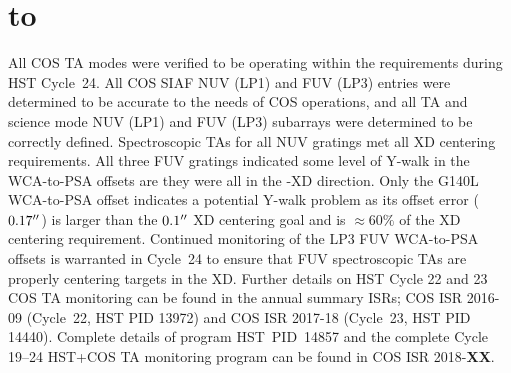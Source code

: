 \documentclass[12pt]{reportj}
\def\arcsec{\hbox{$^{\prime\prime}$}}
\def\ssection#1{\addtocounter{section}{1} \setcounter{subsection}{0} \section*{\hbox to \hsize{\large\bf \arabic{section}. #1\hfill }}}
\begin{document}
\clearpage
\vspace{-0.3cm}
\ssection{Conclusions.\label{sec:theend}}
\vspace{-0.3cm}
All COS TA modes were verified to be operating within the requirements during HST Cycle~24. All COS SIAF NUV (LP1) and FUV (LP3)
entries were determined to be accurate to the needs of COS operations, and all TA and science mode NUV (LP1) and FUV (LP3)
subarrays were determined to be correctly defined.
Spectroscopic TAs for all NUV gratings met all XD centering requirements.
All three FUV gratings indicated some level of Y-walk in the WCA-to-PSA offsets are they were all in the -XD direction.
Only the G140L WCA-to-PSA offset indicates a potential Y-walk problem as its offset error ($0.17\arcsec$) is larger than the $0.1\arcsec$ XD centering goal and is $\approx 60\%$ of the XD centering requirement.
Continued monitoring of the LP3 FUV WCA-to-PSA offsets is warranted in Cycle~24 to ensure that FUV spectroscopic TAs are properly centering targets in the XD.
Further details on HST Cycle 22 and 23 COS TA monitoring can be found in the annual summary ISRs; COS ISR 2016-09 (Cycle~22, HST PID 13972) and COS ISR 2017-18 (Cycle~23, HST PID 14440).
Complete details of program HST~PID~14857 and the complete Cycle 19--24 HST+COS TA monitoring program can be found in COS ISR 2018-{\bf XX}.
\end{document}
